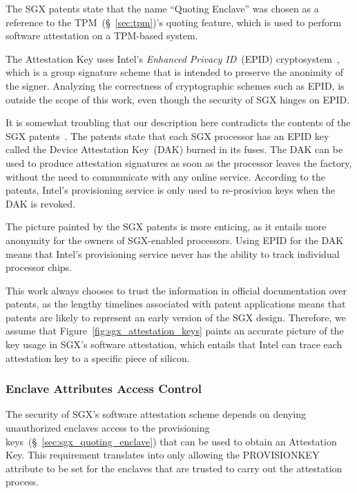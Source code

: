 
The SGX patents state that the name ``Quoting Enclave'' was chosen as a
reference to the TPM~(\S~\ref{sec:tpm})'s quoting feature, which is used to
perform software attestation on a TPM-based system.

The Attestation Key uses Intel's \textit{Enhanced Privacy ID}~(EPID)
cryptosystem~\cite{brickell2009epid}, which is a group signature scheme that is
intended to preserve the anonimity of the signer. Analyzing the correctness of
cryptographic schemes such as EPID, is outside the scope of this work, even
though the security of SGX hinges on EPID.

It is somewhat troubling that our description here contradicts the contents of
the SGX patents~\cite{intel2013patent1, intel2013patent2}. The patents state
that each SGX processor has an EPID key called the Device Attestation Key~(DAK)
burned in its fuses. The DAK can be used to produce attestation signatures as
soon as the processor leaves the factory, without the need to communicate with
any online service. According to the patents, Intel's provisioning service is
only used to re-prosivion keys when the DAK is revoked.

The picture painted by the SGX patents is more enticing, as it entails more
anonymity for the owners of SGX-enabled processors. Using EPID for the DAK
means that Intel's provisioning service never has the ability to track
individual processor chips.

This work always chooses to trust the information in official documentation
over patents, as the lengthy timelines associated with patent applications
means that patents are likely to represent an early version of the SGX design.
Therefore, we assume that Figure~\ref{fig:sgx_attestation_keys} paints an
accurate picture of the key usage in SGX's software attestation, which entails
that Intel can trace each attestation key to a specific piece of silicon.


\subsubsection{Enclave Attributes Access Control}
\label{sec:sgx_launch_enclave}


The security of SGX's software attestation scheme depends on denying
unauthorized enclaves access to the provisioning
keys~(\S~\ref{sec:sgx_quoting_enclave}) that can be used to obtain an
Attestation Key. This requirement translates into only allowing the
PROVISIONKEY attribute to be set for the enclaves that are trusted to carry out
the attestation process.

